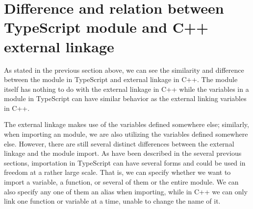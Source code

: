 \documentclass[a4paper]{report}
\begin{document}
\section{Difference and relation between TypeScript module and C++ external linkage}
As stated in the previous section above, we can see the similarity and difference between the module in TypeScript and external linkage in C++. The module itself has nothing to do with the external linkage in C++ while the variables in a module in TypeScript can have similar behavior as the external linking variables in C++. 
\par
The external linkage makes use of the variables defined somewhere else; similarly, when importing an module, we are also utilizing the variables defined somewhere else. However, there are still several distinct differences between the external linkage and the module import. As have been described in the several previous sections, importation in TypeScript can  have several forms and could be used in freedom at a rather large scale. That is, we can specify whether we want to import a variable, a function, or several of them or the entire module. We can also specify any one of them an alias when importing, while in C++ we can only link one function or variable at a time, unable to change the name of it.
\end{document}
